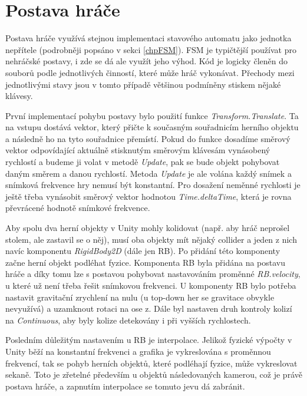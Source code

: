 \documentclass[FM,Proj,bw]{tulthesis}
\begin{document}
	\section{Postava hráče} %
	
	Postava hráče využívá stejnou implementaci stavového automatu jako jednotka nepřítele (podrobněji popsáno v sekci \ref{chpFSM}). FSM je typičtější používat pro nehráčské postavy, i zde se dá ale využít jeho výhod. Kód je logicky členěn do souborů podle jednotlivých činností, které může hráč vykonávat. Přechody mezi jednotlivými stavy jsou v tomto případě většinou podmíněny stiskem nějaké klávesy.
	
	První implementací pohybu postavy bylo použití funkce \textit{Transform.Translate}. Ta na vstupu dostává vektor, který přičte k současným souřadnicím herního objektu a následně ho na tyto souřadnice přemístí. Pokud do funkce dosadíme směrový vektor odpovídající aktuálně stisknutým směrovým klávesám vynásobený rychlostí a budeme ji volat v metodě \textit{Update}, pak se bude objekt pohybovat daným směrem a danou rychlostí. Metoda \textit{Update} je ale volána každý snímek a snímková frekvence hry nemusí být konstantní. Pro dosažení neměnné rychlosti je ještě třeba vynásobit směrový vektor hodnotou \textit{Time.deltaTime}, která je rovna převrácené hodnotě snímkové frekvence.
	
	Aby spolu dva herní objekty v Unity mohly kolidovat (např. aby hráč neprošel stolem, ale zastavil se o něj), musí oba objekty mít nějaký collider a jeden z nich navíc komponentu \textit{RigidBody2D} (dále jen RB). Po přidání této komponenty začne herní objekt podléhat fyzice. Komponenta RB byla přidána na postavu hráče a díky tomu lze s postavou pohybovat nastavováním proměnné \textit{RB.velocity}, u které už není třeba řešit snímkovou frekvenci. U komponenty RB bylo potřeba nastavit gravitační zrychlení na nulu (u top-down her se gravitace obvykle nevyužívá) a uzamknout rotaci na ose z. Dále byl nastaven druh kontroly kolizí na \textit{Continuous}, aby byly kolize detekovány i při vyšších rychlostech.
	
	Posledním důležitým nastavením u RB je interpolace. Jelikož fyzické výpočty v Unity běží na konstantní frekvenci a grafika je vykreslována s proměnnou frekvencí, tak se pohyb herních objektů, které podléhají fyzice, může vykreslovat sekaně. Toto je zřetelné především u objektů následovaných kamerou, což je právě postava hráče, a zapnutím interpolace se tomuto jevu dá zabránit.
	\cite{UnityDocsInterpolation}
	
\end{document}
